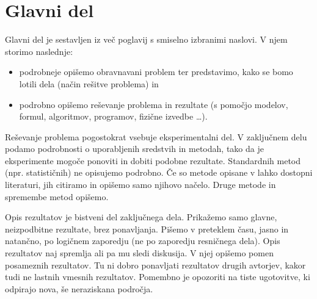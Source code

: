 \chapter{Glavni del}
Glavni del je sestavljen iz več poglavij s smiselno izbranimi naslovi. V njem storimo naslednje:
\begin{itemize}
    \item podrobneje opišemo obravnavani problem ter predstavimo, kako se bomo lotili dela (način rešitve problema) in
    \item podrobno opišemo reševanje problema in rezultate (s pomočjo modelov, formul, algoritmov, programov, fizične izvedbe …).
\end{itemize}    
Reševanje problema pogostokrat vsebuje eksperimentalni del. V zaključnem delu podamo podrobnosti o uporabljenih sredstvih in metodah, tako da je eksperimente mogoče ponoviti in dobiti podobne rezultate. Standardnih metod (npr. statističnih) ne opisujemo podrobno. Če so metode opisane v lahko dostopni literaturi, jih citiramo in opišemo samo njihovo načelo. Druge metode in spremembe metod opišemo.
 
Opis rezultatov je bistveni del zaključnega dela. Prikažemo samo glavne, neizpodbitne rezultate, brez ponavljanja. Pišemo v preteklem času, jasno in natančno, po logičnem zaporedju (ne po zaporedju resničnega dela). Opis rezultatov naj spremlja ali pa mu sledi diskusija. V njej opišemo pomen posameznih rezultatov. Tu ni dobro ponavljati rezultatov drugih avtorjev, kakor tudi ne lastnih vmesnih rezultatov. Pomembno je opozoriti na tiste ugotovitve, ki odpirajo nova, še neraziskana področja.